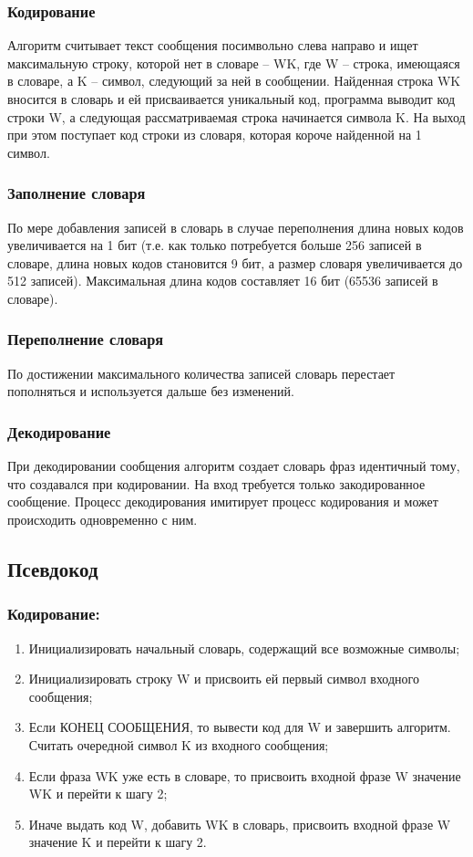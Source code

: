 \documentclass[a4paper]{article}
\begin{document}
\subsubsection{Кодирование}
Алгоритм считывает текст сообщения посимвольно слева направо и ищет максимальную строку, которой нет в словаре – WK, где W – строка, имеющаяся в словаре, а K – символ, следующий за ней в сообщении. Найденная строка WK вносится в словарь и ей присваивается уникальный код, программа выводит код строки W, а следующая рассматриваемая строка начинается символа K. На выход при этом поступает код строки из словаря, которая короче найденной на 1 символ.
\subsubsection{Заполнение словаря}
По мере добавления записей в словарь в случае переполнения длина новых кодов увеличивается на 1 бит (т.е. как только потребуется больше 256 записей в словаре, длина новых кодов становится 9 бит, а размер словаря увеличивается до 512 записей). Максимальная длина кодов составляет 16 бит (65536 записей в словаре). 
\subsubsection{Переполнение словаря}
По достижении максимального количества записей словарь перестает пополняться и используется дальше без изменений.
\subsubsection{Декодирование}
При декодировании сообщения алгоритм создает словарь фраз идентичный тому, что создавался при кодировании. На вход требуется только закодированное сообщение. Процесс декодирования имитирует процесс кодирования и может происходить одновременно с ним.

\subsection{Псевдокод}
\subsubsection{Кодирование:}
\begin{enumerate}
\item Инициализировать начальный словарь, содержащий все возможные символы;
\item Инициализировать строку W и присвоить ей первый символ входного сообщения;
\item Если КОНЕЦ СООБЩЕНИЯ, то вывести код для W и завершить алгоритм.
Считать очередной символ K из входного сообщения;
\item Если фраза WK уже есть в словаре, то присвоить входной фразе W значение WK и перейти к шагу 2;
\item Иначе выдать код W, добавить WK в словарь, присвоить входной фразе W значение K и перейти к шагу 2.
\end{enumerate}
\end{document}
